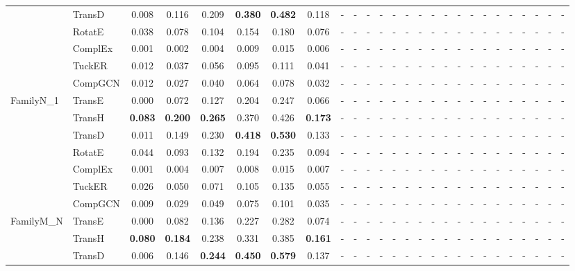 \begin{table}[p]
{\begin{tabular}{l|l||cccccc||cccccc||cccccc||cccccc}
 & TransD & 0.008 & 0.116 & 0.209 & \textbf{0.380} & \textbf{0.482} & 0.118 & - & - & - & - & - & - & - & - & - & - & - & - & - & - & - & - & - & - \\
 & RotatE & 0.038 & 0.078 & 0.104 & 0.154 & 0.180 & 0.076 & - & - & - & - & - & - & - & - & - & - & - & - & - & - & - & - & - & - \\
 & ComplEx & 0.001 & 0.002 & 0.004 & 0.009 & 0.015 & 0.006 & - & - & - & - & - & - & - & - & - & - & - & - & - & - & - & - & - & - \\
 & TuckER & 0.012 & 0.037 & 0.056 & 0.095 & 0.111 & 0.041 & - & - & - & - & - & - & - & - & - & - & - & - & - & - & - & - & - & - \\
 & CompGCN & 0.012 & 0.027 & 0.040 & 0.064 & 0.078 & 0.032 & - & - & - & - & - & - & - & - & - & - & - & - & - & - & - & - & - & - \\
\hline
\multirow{7}{*}{FamilyN\_1} & TransE & 0.000 & 0.072 & 0.127 & 0.204 & 0.247 & 0.066 & - & - & - & - & - & - & - & - & - & - & - & - & - & - & - & - & - & - \\
 & TransH & \textbf{0.083} & \textbf{0.200} & \textbf{0.265} & 0.370 & 0.426 & \textbf{0.173} & - & - & - & - & - & - & - & - & - & - & - & - & - & - & - & - & - & - \\
 & TransD & 0.011 & 0.149 & 0.230 & \textbf{0.418} & \textbf{0.530} & 0.133 & - & - & - & - & - & - & - & - & - & - & - & - & - & - & - & - & - & - \\
 & RotatE & 0.044 & 0.093 & 0.132 & 0.194 & 0.235 & 0.094 & - & - & - & - & - & - & - & - & - & - & - & - & - & - & - & - & - & - \\
 & ComplEx & 0.001 & 0.004 & 0.007 & 0.008 & 0.015 & 0.007 & - & - & - & - & - & - & - & - & - & - & - & - & - & - & - & - & - & - \\
 & TuckER & 0.026 & 0.050 & 0.071 & 0.105 & 0.135 & 0.055 & - & - & - & - & - & - & - & - & - & - & - & - & - & - & - & - & - & - \\
 & CompGCN & 0.009 & 0.029 & 0.049 & 0.075 & 0.101 & 0.035 & - & - & - & - & - & - & - & - & - & - & - & - & - & - & - & - & - & - \\
\hline
\multirow{7}{*}{FamilyM\_N} & TransE & 0.000 & 0.082 & 0.136 & 0.227 & 0.282 & 0.074 & - & - & - & - & - & - & - & - & - & - & - & - & - & - & - & - & - & - \\
 & TransH & \textbf{0.080} & \textbf{0.184} & 0.238 & 0.331 & 0.385 & \textbf{0.161} & - & - & - & - & - & - & - & - & - & - & - & - & - & - & - & - & - & - \\
 & TransD & 0.006 & 0.146 & \textbf{0.244} & \textbf{0.450} & \textbf{0.579} & 0.137 & - & - & - & - & - & - & - & - & - & - & - & - & - & - & - & - & - & - \\

\end{tabular}}
\end{table}
